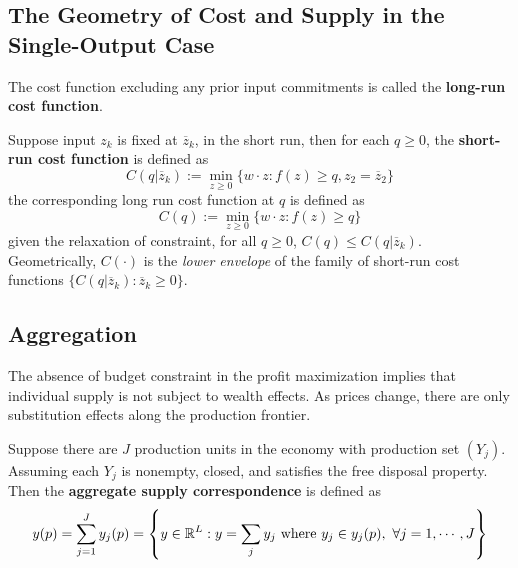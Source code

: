\documentclass{report}
\begin{document}
	 	\subsection{The Geometry of Cost and Supply in the Single-Output Case}
	 		\begin{definition}
	 			The cost function excluding any prior input commitments is called the \textbf{long-run cost function}.
	 		\end{definition}
	 		
	 		\begin{remark}
	 			Suppose input $z_k$ is fixed at $\overline{z}_k$, in the short run, then for each $q \geq 0$, the \textbf{short-run cost function} is defined as
	 			\begin{equation}
	 				C(q|\overline{z}_k) := \min_{z \geq 0}\{w\cdot z: f(z) \geq q, z_2=\overline{z}_2\}
	 			\end{equation}
	 			the corresponding long run cost function at $q$ is defined as 
	 			\begin{equation}
	 				C(q) := \min_{z \geq 0}\{w\cdot z: f(z) \geq q\}
	 			\end{equation}
	 			given the relaxation of constraint, for all $q \geq 0$, $C(q) \leq C(q|\overline{z}_k)$. Geometrically, $C(\cdot)$ is the \emph{lower envelope} of the family of short-run cost functions $\{C(q|\overline{z}_k): \overline{z}_k \geq 0\}$.
	 		\end{remark}
	 		
	 	\subsection{Aggregation}
	 		\begin{remark}
	 			The absence of budget constraint in the profit maximization implies that individual supply is not subject to wealth effects. As prices change, there are only substitution effects along the production frontier.
	 		\end{remark}
	 		
	 		\begin{definition}
	 			Suppose there are $J$ production units in the economy with production set $(Y_j)$. Assuming each $Y_j$ is nonempty, closed, and satisfies the free disposal property. Then the \textbf{aggregate supply correspondence} is defined as
	 			\begin{equation}
	 				y(p)=\sum_{j=1}^{J} y_{j}(p)=\left\{y \in \mathbb{R}^{L} : y=\sum_{j} y_{j} \text{{ where }} y_{j} \in y_{j}(p),\ \forall j=1, \cdots, J\right\}
	 			\end{equation}
	 		\end{definition}
	 		
\end{document}
